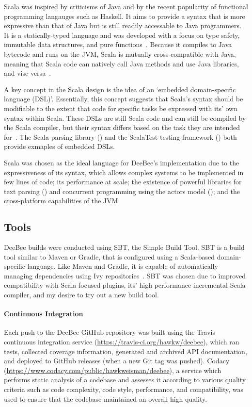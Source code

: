 Scala was inspired by criticisms of Java and by the recent popularity of functional programming langauges such as Haskell. It aims to provide a syntax that is more expressive than that of Java but is still readily accessable to Java programmers. It is a statically-typed language and was developed with a focus on type safety, immutable data structures, and pure functions~\cite{odersky2004scala,odersky2004overview,odersky2008programming}. Because it compiles to Java bytecode and runs on the JVM, Scala is mutually cross-compatible with Java, meaning that Scala code can natively call Java methods and use Java libraries, and vise versa~\cite{odersky2008programming}.

A key concept in the Scala design is the idea of an `embedded domain-specific language (DSL)'. Essentially, this concept suggests that Scala's syntax should be modifiable to the extent that code for specific tasks be expressed with its' own syntax within Scala. These DSLs are still Scala code and can still be compiled by the Scala compiler, but their syntax differs based on the task they are intended for~\cite{ghosh2010dsls,hofer2008polymorphic,odersky2008programming}. The Scala parsing library () and the ScalaTest testing framework () both provide exmaples of embedded DSLs.

Scala was chosen as the ideal language for DeeBee's implementation due to the expressiveness of its syntax, which allows complex systems to be implemented in few lines of code; its performance at scale; the existence of powerful libraries for text parsing () and concurrent programming using the actors model (); and the cross-platform capabilities of the JVM.

\subsection{Tools}

DeeBee builds were conducted using SBT, the Simple Build Tool. SBT is a build tool similar to Maven or Gradle, that is configured using a Scala-based domain-specific language. Like Maven and Gradle, it is capable of automatically managing dependencies using Ivy repositories~\cite{saxena2013getting}. SBT was chosen due to improved compatibility with Scala-focused plugins, its' high performance incremental Scala compiler, and my desire to try out a new build tool. 

\paragraph{Continuous Integration}
Each push to the DeeBee GitHub repository was built using the Travis continuous integration service (\url{https://travis-ci.org/hawkw/deebee}), which ran tests, collected coverage information, generated and archived API documentation, and deployed to GitHub releases  (when a new Git tag was pushed). Codacy (\url{https://www.codacy.com/public/hawkweisman/deebee}), a service which performs static analysis of a codebase and assesses it according to various quality criteria such as code complexity, code style, performance, and compatibility, was used to ensure that the codebase maintained an overall high quality.


